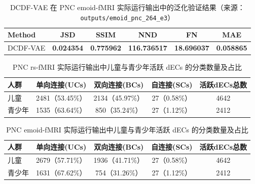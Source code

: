 \begin{table}[h]
  \caption{DCDF-VAE 在 PNC emoid-fMRI 实际运行输出中的泛化验证结果（来源：\texttt{outputs/emoid\_pnc\_264\_e3}）}
  \label{tab:emoid_difference_actual}
  \centering
  \begin{tabular}{l|c|c|c|c|c}
    \hline
    Method & JSD & SSIM & NND & FN & MAE \\
    \hline
    DCDF-VAE & \textbf{0.024354} & \textbf{0.775962} & \textbf{116.736517} & \textbf{18.696037} & \textbf{0.058865} \\
    \hline
  \end{tabular}
\end{table}

\begin{table}[h]
  \caption{PNC rs-fMRI 实际运行输出中儿童与青少年活跃 dECs 的分类数量及占比}
  \label{tab:dec_ratio_actual}
  \centering
  \begin{tabular}{l|c|c|c|c}
    \hline
    人群 & 单向连接(UCs) & 双向连接(BCs) & 自连接(SCs) & 活跃dECs总数 \\
    \hline
    儿童 & 2481（53.45\%） & 2134（45.97\%） & 27（0.58\%） & 4642 \\
    青少年 & 1535（63.64\%） & 850（35.24\%） & 27（1.12\%） & 2412 \\
    \hline
  \end{tabular}
\end{table}

\begin{table}[h]
  \caption{PNC emoid-fMRI 实际运行输出中儿童与青少年活跃 dECs 的分类数量及占比}
  \label{tab:emoid_dec_ratio_actual}
  \centering
  \begin{tabular}{l|c|c|c|c}
    \hline
    人群 & 单向连接(UCs) & 双向连接(BCs) & 自连接(SCs) & 活跃dECs总数 \\
    \hline
    儿童 & 2679（57.71\%） & 1936（41.71\%） & 27（0.58\%） & 4642 \\
    青少年 & 1631（67.62\%） & 754（31.26\%） & 27（1.12\%） & 2412 \\
    \hline
  \end{tabular}
\end{table}
